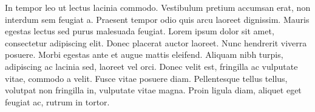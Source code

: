 \documentclass[a4paper,12pt,pagesize,headsepline,bibtotoc,titlepage]{scrartcl}
\begin{document}
In tempor leo ut lectus lacinia commodo. Vestibulum pretium accumsan erat, non interdum sem feugiat a. Praesent tempor odio quis arcu laoreet dignissim. Mauris egestas lectus sed purus malesuada feugiat. Lorem ipsum dolor sit amet, consectetur adipiscing elit. Donec placerat auctor laoreet. Nunc hendrerit viverra posuere. Morbi egestas ante et augue mattis eleifend. Aliquam nibh turpis, adipiscing ac lacinia sed, laoreet vel orci. Donec velit est, fringilla ac vulputate vitae, commodo a velit. Fusce vitae posuere diam. Pellentesque tellus tellus, volutpat non fringilla in, vulputate vitae magna. Proin ligula diam, aliquet eget feugiat ac, rutrum in tortor.



\newpage

 
\end{document}
